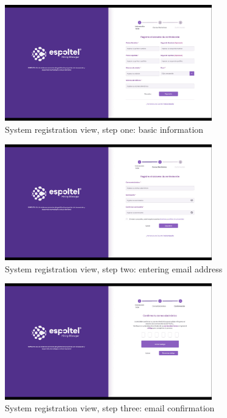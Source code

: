 \documentclass{scrreprt}
\begin{document}
\begin{figure}[H]
	\centering \small
	\includegraphics[width=0.8\textwidth]{WebPrototype/wflow-4.jpeg}
	\caption{System registration view, step one: basic information}
\end{figure}

\begin{figure}[H]
	\centering \small
	\includegraphics[width=0.8\textwidth]{WebPrototype/wflow-5.jpeg}
	\caption{System registration view, step two: entering email address}
\end{figure}

\begin{figure}[H]
	\centering \small
	\includegraphics[width=0.8\textwidth]{WebPrototype/wflow-6.jpeg}
	\caption{System registration view, step three: email confirmation }
\end{figure}
\end{document}
